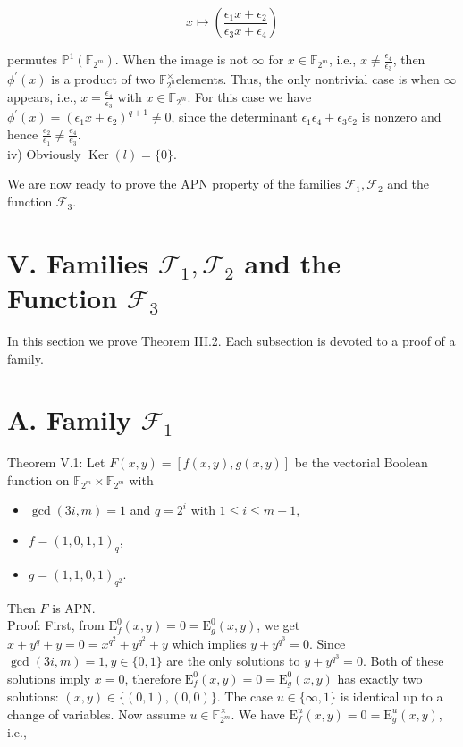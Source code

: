 \documentclass[10pt]{article}
\begin{document}
$$
x \mapsto\left(\frac{\epsilon_{1} x+\epsilon_{2}}{\epsilon_{3} x+\epsilon_{4}}\right)
$$

permutes $\mathbb{P}^{1}\left(\mathbb{F}_{2^{m}}\right)$. When the image is not $\infty$ for $x \in \mathbb{F}_{2^{m}}$, i.e., $x \neq \frac{\epsilon_{4}}{\epsilon_{3}}$, then $\phi^{\prime}(x)$ is a product of two $\mathbb{F}_{2^{n}}^{\times}$elements. Thus, the only nontrivial case is when $\infty$ appears, i.e., $x=\frac{\epsilon_{4}}{\epsilon_{3}}$ with $x \in \mathbb{F}_{2^{m}}$. For this case we have $\phi^{\prime}(x)=\left(\epsilon_{1} x+\epsilon_{2}\right)^{q+1} \neq 0$, since the determinant $\epsilon_{1} \epsilon_{4}+\epsilon_{3} \epsilon_{2}$ is nonzero and hence $\frac{e_{2}}{e_{1}} \neq \frac{e_{4}}{e_{3}}$.\\
iv) Obviously $\operatorname{Ker}(l)=\{0\}$.

We are now ready to prove the APN property of the families $\mathcal{F}_{1}, \mathcal{F}_{2}$ and the function $\mathcal{F}_{3}$.

\section*{V. Families $\mathcal{F}_{1}, \mathcal{F}_{2}$ and the Function $\mathcal{F}_{3}$}
In this section we prove Theorem III.2. Each subsection is devoted to a proof of a family.

\section*{A. Family $\mathcal{F}_{1}$}
Theorem V.1: Let $F(x, y)=[f(x, y), g(x, y)]$ be the vectorial Boolean function on $\mathbb{F}_{2^{m}} \times \mathbb{F}_{2^{m}}$ with

\begin{itemize}
  \item $\operatorname{gcd}(3 i, m)=1$ and $q=2^{i}$ with $1 \leq i \leq m-1$,
  \item $f=(1,0,1,1)_{q}$,
  \item $g=(1,1,0,1)_{q^{2}}$.
\end{itemize}

Then $F$ is APN.\\
Proof: First, from $\mathrm{E}_{f}^{0}(x, y)=0=\mathrm{E}_{g}^{0}(x, y)$, we get $x+y^{q}+y=0=x^{q^{2}}+y^{q^{2}}+y$ which implies $y+y^{q^{3}}=0$. Since $\operatorname{gcd}(3 i, m)=1, y \in\{0,1\}$ are the only solutions to $y+y^{q^{3}}=0$. Both of these solutions imply $x=0$, therefore $\mathrm{E}_{f}^{0}(x, y)=0=\mathrm{E}_{g}^{0}(x, y)$ has exactly two solutions: $(x, y) \in\{(0,1),(0,0)\}$. The case $u \in\{\infty, 1\}$ is identical up to a change of variables. Now assume $u \in \mathbb{F}_{2^{m}}^{\times}$. We have $\mathrm{E}_{f}^{u}(x, y)=0=\mathrm{E}_{g}^{u}(x, y)$, i.e.,
\end{document}
